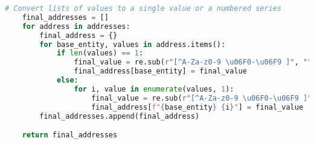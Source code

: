 \documentclass{solutionclass} %
\begin{document}
\begin{lstlisting}[language=Python]
    # Convert lists of values to a single value or a numbered series
    final_addresses = []
    for address in addresses:
        final_address = {}
        for base_entity, values in address.items():
            if len(values) == 1:
                final_value = re.sub(r"[^A-Za-z0-9 \u06F0-\u06F9 ]", "", values[0]).strip() # Remove non-letter and non-space characters and remove leading and trailing spaces
                final_address[base_entity] = final_value
            else:
                for i, value in enumerate(values, 1):
                    final_value = re.sub(r"[^A-Za-z0-9 \u06F0-\u06F9 ]", "", value).strip()  # Remove non-letter and non-space characters and remove leading and trailing spaces
                    final_address[f"{base_entity} {i}"] = final_value
        final_addresses.append(final_address)

    return final_addresses
\end{lstlisting}
\end{document}
